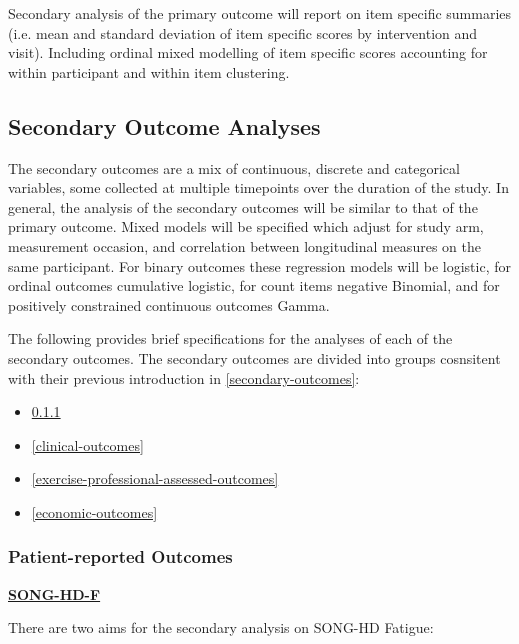 \documentclass[11pt,parskip=half-]{scrartcl}
\providecommand{\tightlist}{%
  \setlength{\itemsep}{0pt}\setlength{\parskip}{0pt}}
\begin{document}
Secondary analysis of the primary outcome will report on item specific summaries (i.e. mean and standard deviation of item specific scores by intervention and visit). Including ordinal mixed modelling of item specific scores accounting for within participant and within item clustering.

\subsection{Secondary Outcome Analyses}\label{secondary-outcome-analyses}

The secondary outcomes are a mix of continuous, discrete and categorical variables, some collected at multiple timepoints over the duration of the study. In general, the analysis of the secondary outcomes will be similar to that of the primary outcome. Mixed models will be specified which adjust for study arm, measurement occasion, and correlation between longitudinal measures on the same participant. For binary outcomes these regression models will be logistic, for ordinal outcomes cumulative logistic, for count items negative Binomial, and for positively constrained continuous outcomes Gamma.

The following provides brief specifications for the analyses of each of the secondary outcomes. The secondary outcomes are divided into groups cosnsitent with their previous introduction in \ref{secondary-outcomes}:

\begin{itemize}
  \tightlist
  \item \ref{patient-reported-outcomes} 
  \item \ref{clinical-outcomes} 
  \item \ref{exercise-professional-assessed-outcomes} 
  \item \ref{economic-outcomes} 
\end{itemize}

\subsubsection{Patient-reported Outcomes}\label{patient-reported-outcomes}

\label{analysis:song-hd-f}
\hyperref[outcome:song-hd-f]{\textbf{SONG-HD-F}}

There are two aims for the secondary analysis on SONG-HD Fatigue:
\end{document}
